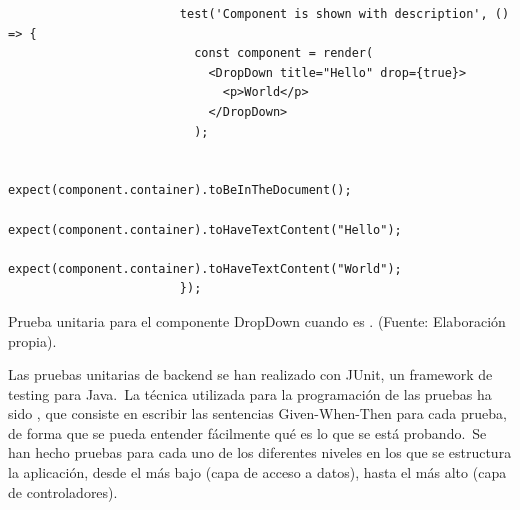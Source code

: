 \begin{codeBlock}
	\begin{verbatim}
						test('Component is shown with description', () => {
						  const component = render(
						    <DropDown title="Hello" drop={true}>
						      <p>World</p>
						    </DropDown>
						  );

						  expect(component.container).toBeInTheDocument();
						  expect(component.container).toHaveTextContent("Hello");
						  expect(component.container).toHaveTextContent("World");
						});
	\end{verbatim}
	\caption{Prueba unitaria para el componente DropDown cuando  es .
		(Fuente: Elaboración propia).}
	\label{code:prueba-unitaria-dropdown-true}
\end{codeBlock}


Las pruebas unitarias de backend se han realizado con JUnit, un framework de testing para Java.\ La técnica utilizada
para la programación de las pruebas ha sido , que consiste en escribir las
sentencias Given-When-Then para cada prueba, de forma que se pueda entender fácilmente qué es lo que se está
probando.\ Se han hecho pruebas para cada uno de los diferentes niveles en los que se estructura la aplicación, desde
el más bajo (capa de acceso a datos), hasta el más alto (capa de controladores).

